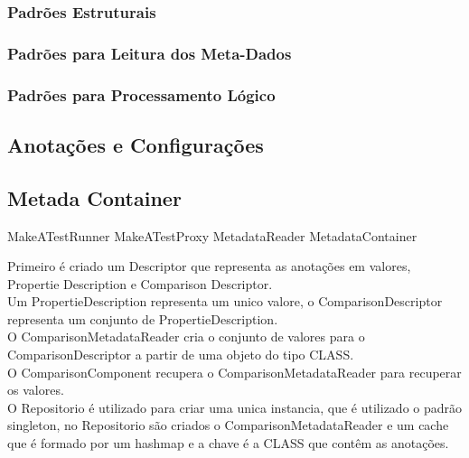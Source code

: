 \documentclass{abnt}
\begin{document}
\subsubsection{Padrões Estruturais}



\subsubsection{Padrões para Leitura dos Meta-Dados}
\subsubsection{Padrões para Processamento Lógico}

\subsection{Anotações e Configurações}





\subsection{Metada Container}
MakeATestRunner
MakeATestProxy
MetadataReader
MetadataContainer


Primeiro é criado um Descriptor que representa as anotações em valores, Propertie Description e Comparison Descriptor.\\
Um PropertieDescription representa um unico valore, o ComparisonDescriptor representa um conjunto de PropertieDescription.\\

O ComparisonMetadataReader cria o conjunto de valores para o ComparisonDescriptor a partir de uma objeto do tipo CLASS.\\

O ComparisonComponent recupera o ComparisonMetadataReader para recuperar os valores.\\

O Repositorio é utilizado para criar uma unica instancia, que é utilizado o padrão singleton, no Repositorio são criados o ComparisonMetadataReader e um cache que é formado por um hashmap e a chave é a CLASS que contêm as anotações.



\end{document}
